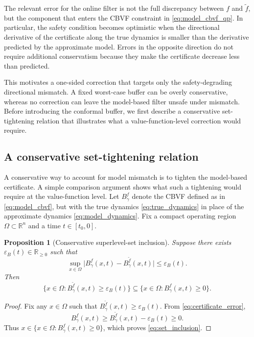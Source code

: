 \documentclass[letterpaper,10pt,conference]{ieeeconf}
\newtheorem{proposition}{Proposition}
\newcommand{\R}{\mathbb{R}}
\newcommand{\Bm}{B_{\gamma}^{\tilde f}}
\newcommand{\Bt}{B_{\gamma}^{f}}
\newcommand{\fapp}{\widetilde{f}}
\newcommand{\xv}{x}
\begin{document}
The relevant error for the online filter is not the full discrepancy between
$f$ and $\fapp$, but the component that enters the CBVF constraint in
\eqref{eq:model_cbvf_qp}. In particular, the safety condition becomes
optimistic when the directional derivative of the certificate along the true
dynamics is smaller than the derivative predicted by the approximate model.
Errors in the opposite direction do not require additional conservatism because
they make the certificate decrease less than predicted.

This motivates a one-sided correction that targets only the safety-degrading
directional mismatch. A fixed worst-case buffer can be overly conservative,
whereas no correction can leave the model-based filter unsafe under mismatch.
Before introducing the conformal buffer, we first describe a conservative
set-tightening relation that illustrates what a value-function-level correction
would require.

\subsection{A conservative set-tightening relation}

A conservative way to account for model mismatch is to tighten the model-based
certificate. A simple comparison argument shows what such a tightening would
require at the value-function level. Let $\Bt$ denote the CBVF defined as in
\eqref{eq:model_cbvf}, but with the true dynamics \eqref{eq:true_dynamics} in
place of the approximate dynamics \eqref{eq:model_dynamics}. Fix a compact
operating region $\Omega\subset\R^n$ and a time $t\in[t_0,0]$.

\begin{proposition}[Conservative superlevel-set inclusion]
\label{prop:set_inclusion}
Suppose there exists $\varepsilon_B(t)\in\R_{\ge 0}$ such that
\begin{equation}
    \sup_{\xv\in\Omega}
    \bigl|\Bt(\xv,t)-\Bm(\xv,t)\bigr|
    \le \varepsilon_B(t).
    \label{eq:certificate_error}
\end{equation}
Then
\begin{equation}
    \{\xv\in\Omega : \Bm(\xv,t)\ge \varepsilon_B(t)\}
    \subseteq
    \{\xv\in\Omega : \Bt(\xv,t)\ge 0\}.
    \label{eq:set_inclusion}
\end{equation}
\end{proposition}

\begin{proof}
Fix any $\xv\in\Omega$ such that $\Bm(\xv,t)\ge\varepsilon_B(t)$. From
\eqref{eq:certificate_error},
\[
    \Bt(\xv,t)
    \ge
    \Bm(\xv,t)-\varepsilon_B(t)
    \ge 0.
\]
Thus $\xv\in\{\xv\in\Omega:\Bt(\xv,t)\ge0\}$, which proves
\eqref{eq:set_inclusion}.
\end{proof}
\end{document}
